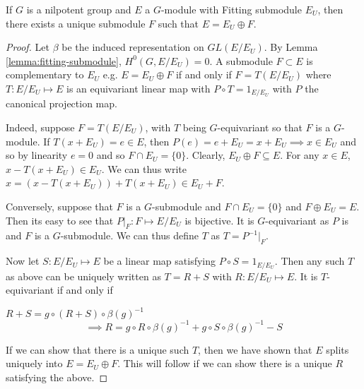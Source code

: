\begin{lemma}
    If $G$ is a nilpotent group and $E$ a $G$-module with Fitting submodule $E_U$, then there exists a
    unique submodule $F$ such that $E = E_U \oplus F$.
\end{lemma}
\begin{proof}
    \label{lemma:fitting-unique-decomp}
    Let $\beta$ be the induced representation on $GL(E/E_U)$. By Lemma \ref{lemma:fitting-submodule}, $H^0(G, E/E_U) = 0$.
    A submodule $F \subset E$ is complementary to $E_U$ e.g. $E = E_U \oplus F$ if and only if
    $F=T(E/E_U)$ where $T:E/E_U \mapsto E$ is an equivariant linear map with $P \circ T = 1_{E/E_U}$ with $P$ the
    canonical projection map.

    Indeed, suppose $F=T(E/E_U)$, with $T$ being $G$-equivariant so that $F$ is a
    $G$-module. If $T(x+E_U) = e \in E$, then $P(e) = e+E_U = x+E_U \implies x \in
        E_U$ and so by linearity $e = 0$ and so $F \cap E_U = \{0\}$. Clearly, $E_U
        \oplus F \subseteq E$. For any $x \in E$, $x-T(x+E_U) \in E_U$. We can thus
    write $x = (x-T(x+E_U)) + T(x+E_U) \in E_U + F$.

    Conversely, suppose that $F$ is a $G$-submodule and $F \cap E_U = \{0\}$ and $F
        \oplus E_U = E$. Then its easy to see that $P|_F : F \mapsto E/E_U$ is
    bijective. It is $G$-equivariant as $P$ is and $F$ is a $G$-submodule. We can
    thus define $T$ as $T = P^{-1}|_F$.

    Now let $S: E/E_U \mapsto E$ be a linear map satisfying $P \circ S =
        1_{E/E_U}$. Then any such $T$ as above can be uniquely written as $T = R + S$
    with $R: E/E_U \mapsto E$. It is $T$-equivariant if and only if

    \begin{center}
        $R + S = g \circ (R + S)\circ \beta(g)^{-1}$\\
        \begin{equation}\label{eq:fixed-point}
            \implies R = g\circ R \circ \beta(g)^{-1} + g\circ S \circ \beta(g)^{-1} - S
        \end{equation}
    \end{center}
    If we can show that there is a unique such $T$, then we have shown that $E$ splits uniquely into $E = E_U \oplus F$.
    This will follow if we can show there is a unique $R$ satisfying the above.


\end{proof}
